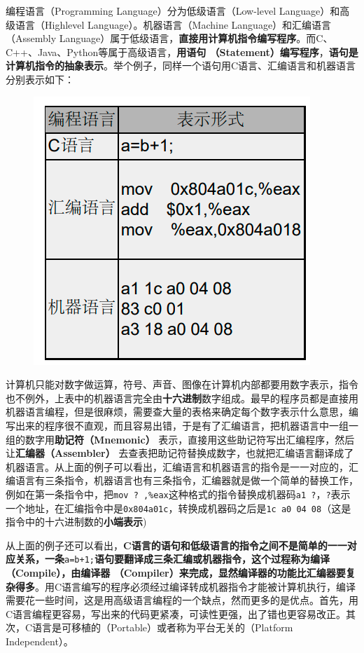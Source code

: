 \documentclass[12pt]{book}
\begin{document}
编程语言（Programming Language）分为低级语言（Low-level
Language）和高级语言（Highlevel Language）。机器语言（Machine
Language）和汇编语言（Assembly
Language）属于低级语言，\textbf{直接用计算机指令编写程序}。而C、C++、Java、Python等属于高级语言，\textbf{用语句
（Statement）编写程序}，\textbf{语句是计算机指令的抽象表示}。举个例子，同样一个语句用C语言、汇编语言和机器语言分别表示如下：\\
\begin{figure}[H]\centering\includegraphics[scale=0.7]{image//C语言入门//程序的基本概念//1.png}\end{figure}

计算机只能对数字做运算，符号、声音、图像在计算机内部都要用数字表示，指令也不例外，上表中的机器语言完全由\textbf{十六进制}数字组成。最早的程序员都是直接用机器语言编程，但是很麻烦，需要查大量的表格来确定每个数字表示什么意思，编写出来的程序很不直观，而且容易出错，于是有了汇编语言，把机器语言中一组一组的数字用\textbf{助记符（Mnemonic）}
表示，直接用这些助记符写出汇编程序，然后让\textbf{汇编器（Assembler）}
去查表把助记符替换成数字，也就把汇编语言翻译成了机器语言。从上面的例子可以看出，汇编语言和机器语言的指令是一一对应的，汇编语言有三条指令，机器语言也有三条指令，汇编器就是做一个简单的替换工作，例如在第一条指令中，把\texttt{mov\ ?\ ,\%eax}这种格式的指令替换成机器码\texttt{a1\ ?}，\texttt{?}表示一个地址，在汇编指令中是\texttt{0x804a01c}，转换成机器码之后是\texttt{1c\ a0\ 04\ 08}（这是指令中的十六进制数的\textbf{小端表示})

从上面的例子还可以看出，\textbf{C语言的语句和低级语言的指令之间不是简单的一一对应关系，一条}\texttt{a=b+1;}\textbf{语句要翻译成三条汇编或机器指令，这个过程称为编译（Compile），由编译器
（Compiler）来完成，显然编译器的功能比汇编器要复杂得多}。用C语言编写的程序必须经过编译转成机器指令才能被计算机执行，编译需要花一些时间，这是用高级语言编程的一个缺点，然而更多的是优点。首先，用C语言编程更容易，写出来的代码更紧凑，可读性更强，出了错也更容易改正。其次，C语言是可移植的（Portable）或者称为平台无关的（Platform
Independent）。
\end{document}
